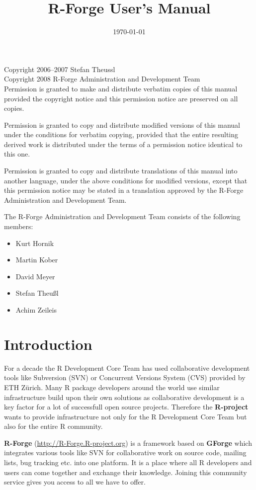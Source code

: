 \documentclass[a4paper]{article}
\title{R-Forge User's Manual}
\author{\RFORGE}
\date{\today}
\newcommand{\RFORGE}{R-Forge Administration and Development Team}
\begin{document}
\maketitle


\newpage
Copyright 2006--2007 Stefan Theussl\\
Copyright 2008 \RFORGE{}\\

Permission is granted to make and distribute verbatim copies of this
manual provided the copyright notice and this permission notice are
preserved on all copies.

Permission is granted to copy and distribute modified versions of this
manual under the conditions for verbatim copying, provided that the
entire resulting derived work is distributed under the terms of a
permission notice identical to this one. 

Permission is granted to copy and distribute translations of this
manual into another language, under the above conditions for modified
versions, except that this permission notice may be stated in a
translation approved by the \RFORGE{}. 

The \RFORGE{} consists of the
following members:

\begin{itemize}
\item Kurt Hornik  
\item Martin Kober 
\item David Meyer 
\item Stefan Theu\ss{}l
\item Achim Zeileis
\end{itemize}

\newpage
\section{Introduction}
\label{sec:intro}

For a decade the R Development Core Team has used collaborative
development tools like Subversion (SVN) or Concurrent Versions System
(CVS) provided by ETH Z\"urich.  
Many R package
developers around the world use similar infrastructure build upon their own
solutions as collaborative development is a key factor for a lot of
successfull open source projects. Therefore the \textbf{R-project}
wants to provide infrastructure not only
for the R Development Core Team but also for the entire R community.

\textbf{R-Forge} (\url{http://R-Forge.R-project.org}) is a
framework based on 
\textbf{GForge} \citep{manual:gforge} which integrates various tools like
SVN for collaborative work on source code, mailing lists, bug tracking
etc. into one platform. It is a
place where all R developers and users can come together and exchange
their knowledge. Joining this community service gives you access to
all we have to offer.
\end{document}

